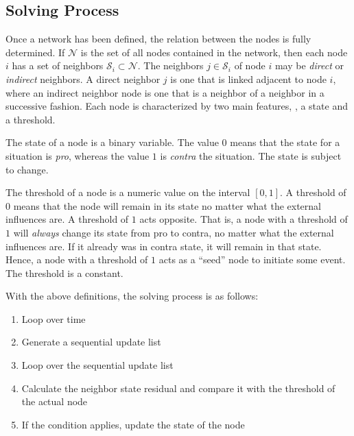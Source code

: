 
\subsection{Solving Process}
\label{sec:descriptioSolving}

Once a network has been defined, the relation between the nodes is fully
determined.  If $\mathcal{N}$ is the set of all nodes contained in the network,
then each node $i$ has a set of neighbors $\mathcal{S}_i \subset \mathcal{N}$.
The neighbors $j\in\mathcal{S}_i$ of node $i$ may be \emph{direct} or
\emph{indirect} neighbors.  A direct neighbor $j$ is one that is linked
adjacent to node $i$, where an indirect neighbor node is one that is a neighbor
of a neighbor in a successive fashion.  Each node is characterized by two main
features, \ie, a state and a threshold.
\begin{definition}
  The state of a node is a binary variable.  The value $0$ means that the state
  for a situation is \emph{pro}, whereas the value $1$ is \emph{contra} the
  situation.  The state is subject to change.
\end{definition}
\begin{definition}
  The threshold of a node is a numeric value on the interval $[0,1]$.  A
  threshold of $0$ means that the node will remain in its state no matter what
  the external influences are.  A threshold of $1$ acts opposite.  That is, a
  node with a threshold of $1$ will \emph{always} change its state from pro to
  contra, no matter what the external influences are.  If it already was in
  contra state, it will remain in that state.  Hence, a node with a threshold
  of $1$ acts as a ``seed'' node to initiate some event.  The threshold is a
  constant.
\end{definition}

With the above definitions, the solving process is as follows:
\begin{enumerate}
\item Loop over time
\item Generate a sequential update list
\item Loop over the sequential update list
\item Calculate the neighbor state residual and compare it with the threshold
  of the actual node
\item If the condition applies, update the state of the node
\end{enumerate}

